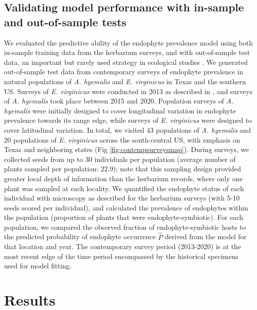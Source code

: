 \documentclass[11pt]{article}
\let\cite\citep
\begin{document}
\subsection*{Validating model performance with in-sample and out-of-sample tests}
We evaluated the predictive ability of the endophyte prevalence model using both in-sample training data from the herbarium surveys, and with out-of-sample test data, an important but rarely used strategy in ecological studies \cite{tredennick2021practical, lee2024phenological}.
We generated out-of-sample test data from contemporary surveys of endophyte prevalence in natural populations of \emph{A. hyemalis} and \emph{E. virginicus} in Texas and the southern US. 
Surveys of \emph{E. virginicus} were conducted in 2013 as described in \citet{sneck2017variation}, and surveys of \emph{A. hyemalis} took place between 2015 and 2020.
Population surveys of \emph{A. hyemalis} were initially designed to cover longitudinal variation in endophyte prevalence towards its range edge, while surveys of \emph{E. virginicus} were designed to cover latitudinal variation. 
In total, we visited 43 populations of \emph{A. hyemalis} and 20 populations of \emph{E. virginicus} across the south-central US, with emphasis on Texas and neighboring states (Fig \ref{fig:contempsurveysmap}).
During surveys, we collected seeds from up to 30 individuals per population (average number of plants sampled per population: $22.9$); note that this sampling design provided greater local depth of information than the herbarium records, where only one plant was sampled at each locality.
We quantified the endophyte status of each individual with microscopy as described for the herbarium surveys (with 5-10 seeds scored per individual), and calculated the prevalence of endophytes within the population (proportion of plants that were endophyte-symbiotic).
For each population, we compared the observed fraction of endophyte-symbiotic hosts to the predicted probability of endophyte occurrence $\hat{P}$ derived from the model for that location and year. 
The contemporary survey period (2013-2020) is at the most recent edge of the time period encompassed by the historical specimens used for model fitting. 

		
\section*{Results}
\end{document}

